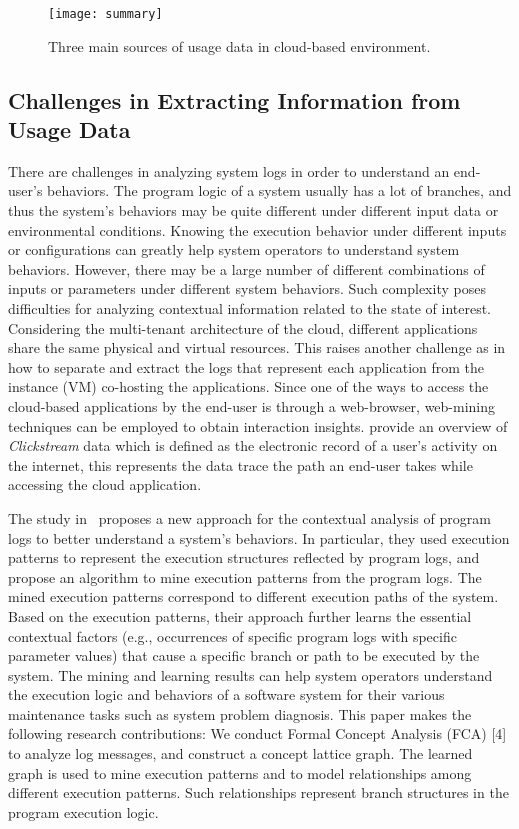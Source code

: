 \begin{figure*}[t!]
	\centering
	\texttt{[image: summary]}
	\caption{Three main sources of usage data in cloud-based environment.}
	\label{fig:schema}
\end{figure*}

\subsection{Challenges in Extracting Information from Usage Data}

There are challenges in analyzing system logs in order to understand an end-user’s behaviors. The program logic of a system usually has a lot of branches, and thus the system’s behaviors may be quite different under different input data or environmental conditions. Knowing the execution behavior under different inputs or configurations can greatly help system operators to understand system behaviors. However, there may be a large number of different combinations of inputs or parameters under different system behaviors. Such complexity poses difficulties for analyzing contextual information related to the state of interest. Considering the multi-tenant architecture of the cloud, different applications share the same physical and virtual resources. This raises another challenge as in how to separate and extract the logs that represent each application from the instance (VM) co-hosting the applications. 
%
Since one of the ways to access the cloud-based applications by the end-user is through a web-browser, web-mining techniques can be employed to obtain interaction insights. \cite{Bucklin2009} provide an overview of \emph{Clickstream} data which is defined as the electronic record of a user's activity on the internet, this represents the data trace the path an end-user takes while accessing the cloud application. 

The study in~\cite{Fu2013} proposes a new approach for the contextual analysis of program logs to better understand a system’s behaviors. In particular, they used execution patterns to represent the execution structures reflected by program logs, and propose an algorithm to mine execution patterns from the program logs. The mined execution patterns correspond to different execution paths of the system. Based on the execution patterns, their approach further learns the essential contextual factors (e.g., occurrences of specific program logs with specific parameter values) that cause a specific branch or path to be executed by the system. 
% 
% 
%
The mining and learning results can help system operators understand the execution logic and behaviors of a software system for their various maintenance tasks such as system problem diagnosis. This paper makes the following research contributions: We conduct Formal Concept Analysis (FCA) [4] to analyze log messages, and construct a concept lattice graph. The learned graph is used to mine execution patterns and to model relationships among different execution patterns. Such relationships represent branch structures in the program execution logic.

